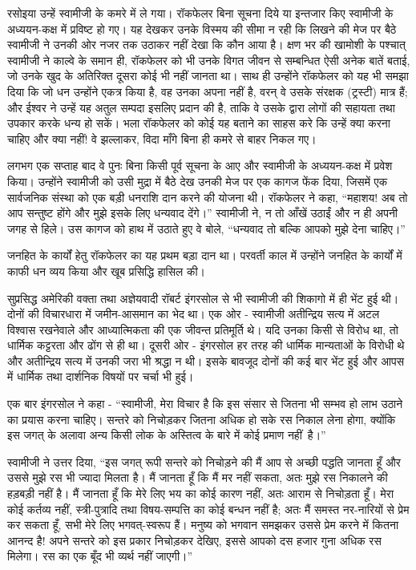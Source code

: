 रसोइया उन्हें स्वामीजी के कमरे में ले गया। रॉकफेलर बिना सूचना दिये या इन्तजार किए स्वामीजी के अध्ययन-कक्ष में प्रविष्ट हो गए। यह देखकर उनके विस्मय की सीमा न रही कि लिखने की मेज पर बैठे स्वामीजी ने उनकी ओर नजर तक उठाकर नहीं देखा कि कौन आया है। क्षण भर की खामोशी के पश्चात् स्वामीजी ने काल्वे के समान ही, रॉकफेलर को भी उनके विगत जीवन से सम्बन्धित ऐसी अनेक बातें बताई, जो उनके खुद के अतिरिक्त दूसरा कोई भी नहीं जानता था। साथ ही उन्होंने रॉकफेलर को यह भी समझा दिया कि जो धन उन्होंने एकत्र किया है, वह उनका अपना नहीं है, वरन् वे उसके संरक्षक (ट्रस्टी) मात्र हैं; और ईश्वर ने उन्हें यह अतुल सम्पदा इसलिए प्रदान की है, ताकि वे उसके द्वारा लोगों की सहायता तथा उपकार करके धन्य हो सकें। भला रॉकफेलर को कोई यह बताने का साहस करे कि उन्हें क्या करना चाहिए और क्या नहीं! वे झल्लाकर, विदा माँगे बिना ही कमरे से बाहर निकल गए। 

लगभग एक सप्ताह बाद वे पुनः बिना किसी पूर्व सूचना के आए और स्वामीजी के अध्ययन-कक्ष में प्रवेश किया। उन्होंने स्वामीजी को उसी मुद्रा में बैठे देख उनकी मेज पर एक कागज फेंक दिया, जिसमें एक सार्वजनिक संस्था को एक बड़ी धनराशि दान करने की योजना थी। रॉकफेलर ने कहा, “महाशय! अब तो आप सन्तुष्ट होंगे और मुझे इसके लिए धन्यवाद देंगे।” स्वामीजी ने, न तो आँखें उठाईं और न ही अपनी जगह से हिले। उस कागज को हाथ में उठाते हुए वे बोले, “धन्यवाद तो बल्कि आपको मुझे देना चाहिए।” 

जनहित के कार्यों हेतु रॉकफेलर का यह प्रथम बड़ा दान था। परवर्ती काल में उन्होंने जनहित के कार्यों में काफी धन व्यय किया और खूब प्रसिद्धि हासिल की। 

\vskip -6pt

\delimiter

सुप्रसिद्ध अमेरिकी वक्ता तथा अज्ञेयवादी रॉबर्ट इंगरसोल से भी स्वामीजी की शिकागो में ही भेंट हुई थी। दोनों की विचारधारा में जमीन-आसमान का भेद था। एक ओर - स्वामीजी अतीन्द्रिय सत्य में अटल विश्वास रखनेवाले और आध्यात्मिकता की एक जीवन्त प्रतिमूर्ति थे। यदि उनका किसी से विरोध था, तो धार्मिक कट्टरता और ढोंग से ही था। दूसरी ओर - इंगरसोल हर तरह की धार्मिक मान्यताओं के विरोधी थे और अतीन्द्रिय सत्य में उनकी जरा भी श्रद्धा न थी। इसके बावजूद दोनों की कई बार भेंट हुई और आपस में धार्मिक तथा दार्शनिक विषयों पर चर्चा भी हुई। 

एक बार इंगरसोल ने कहा - “स्वामीजी, मेरा विचार है कि इस संसार से जितना भी सम्भव हो लाभ उठाने का प्रयास करना चाहिए। सन्तरे को निचोड़कर जितना अधिक हो सके रस निकाल लेना होगा, क्योंकि इस जगत् के अलावा अन्य किसी लोक के अस्तित्व के बारे में कोई प्रमाण नहीं~है।” 

स्वामीजी ने उत्तर दिया, “इस जगत् रूपी सन्तरे को निचोड़ने की मैं आप से अच्छी पद्धति जानता हूँ और उससे मुझे रस भी ज्यादा मिलता है। मैं जानता हूँ कि मैं मर नहीं सकता, अतः मुझे रस निकालने की हड़बड़ी नहीं है। मैं जानता हूँ कि मेरे लिए भय का कोई कारण नहीं, अतः आराम से निचोड़ता हूँ। मेरा कोई कर्तव्य नहीं, स्त्री-पुत्रादि तथा विषय-सम्पत्ति का कोई बन्धन नहीं है; अतः मैं समस्त नर-नारियों से प्रेम कर सकता हूँ, सभी मेरे लिए भगवत्-स्वरूप हैं। मनुष्य को भगवान समझकर उससे प्रेम करने में कितना आनन्द है! अपने सन्तरे को इस प्रकार निचोड़कर देखिए, इससे आपको दस हजार गुना अधिक रस मिलेगा। रस का एक बूँद भी व्यर्थ नहीं जाएगी।” 

